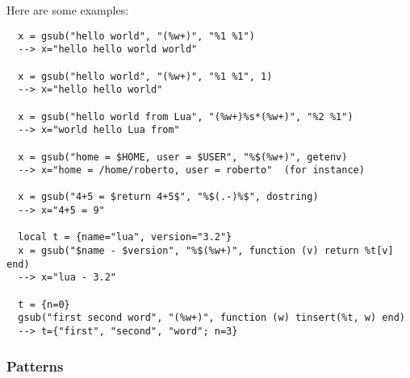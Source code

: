 \documentclass[11pt]{article}
\begin{document}
Here are some examples:
\begin{verbatim}
  x = gsub("hello world", "(%w+)", "%1 %1")
  --> x="hello hello world world"

  x = gsub("hello world", "(%w+)", "%1 %1", 1)
  --> x="hello hello world"

  x = gsub("hello world from Lua", "(%w+)%s*(%w+)", "%2 %1")
  --> x="world hello Lua from"

  x = gsub("home = $HOME, user = $USER", "%$(%w+)", getenv)
  --> x="home = /home/roberto, user = roberto"  (for instance)

  x = gsub("4+5 = $return 4+5$", "%$(.-)%$", dostring)
  --> x="4+5 = 9"

  local t = {name="lua", version="3.2"}
  x = gsub("$name - $version", "%$(%w+)", function (v) return %t[v] end)
  --> x="lua - 3.2"

  t = {n=0}
  gsub("first second word", "(%w+)", function (w) tinsert(%t, w) end)
  --> t={"first", "second", "word"; n=3}
\end{verbatim}


\subsubsection*{Patterns} \label{pm}
\end{document}
